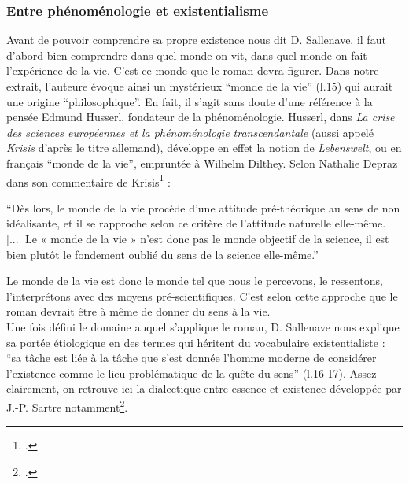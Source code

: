 \documentclass[a4paper,10pt]{article}
\begin{document}
			\subsubsection{Entre phénoménologie et existentialisme} \label{pheno}
				Avant de pouvoir comprendre sa propre existence nous dit D. Sallenave, il faut d'abord bien comprendre dans quel monde on vit, dans quel monde on fait l'expérience de la vie. C'est ce monde que le roman devra figurer. Dans notre extrait, l'auteure évoque ainsi un mystérieux ``monde de la vie'' (l.15) qui aurait une origine ``philosophique''. En fait, il s'agit sans doute d'une référence à la pensée Edmund Husserl, fondateur de la phénoménologie. Husserl, dans \textit{La crise des sciences européennes et la phénoménologie transcendantale} (aussi appelé \textit{Krisis} d'après le titre allemand), développe en effet la notion de \textit{Lebenswelt}, ou en français ``monde de la vie'', empruntée à Wilhelm Dilthey. Selon Nathalie Depraz dans son commentaire de Krisis\footcite{Depraz2012} :
				\begin{center}
					\footnotesize
					\begin{minipage}{0.7\textwidth}
						``Dès lors, le monde de la vie procède d’une attitude pré-théorique au sens de non idéalisante, et il se rapproche selon ce critère de l’attitude naturelle elle-même. [...] Le « monde de la vie » n’est donc pas le monde objectif de la science, il est bien plutôt le fondement oublié du sens de
						la science elle-même.''
					\end{minipage}
				\end{center}
				Le monde de la vie est donc le monde tel que nous le percevons, le ressentons, l'interprétons avec des moyens pré-scientifiques. C'est selon cette approche que le roman devrait être à même de donner du sens à la vie.\\
				Une fois défini le domaine auquel s'applique le roman, D. Sallenave nous explique sa portée étiologique en des termes qui héritent du vocabulaire existentialiste : ``sa tâche est liée à la tâche que s'est donnée l'homme moderne de considérer l'existence comme le lieu problématique de la quête du sens'' (l.16-17). Assez clairement, on retrouve ici la dialectique entre essence et existence développée par J.-P. Sartre notamment\footcite{Sartre1945}.
\end{document}
